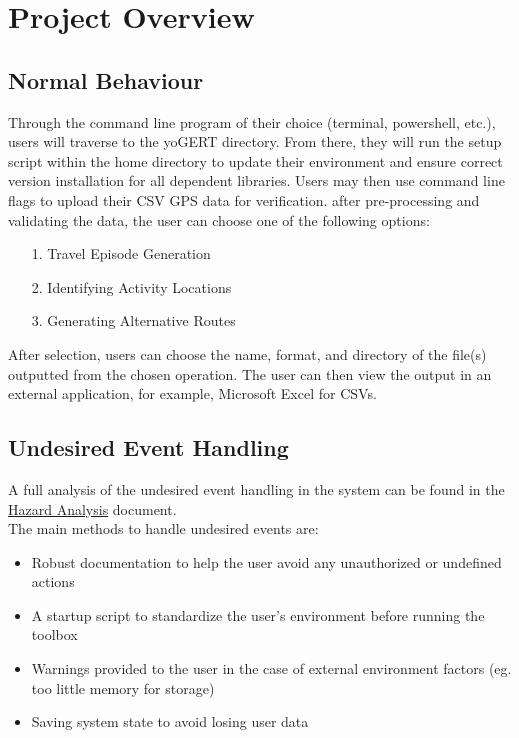 \documentclass[12pt, titlepage]{article}
\begin{document}
\newpage
\section{Project Overview}

\subsection{Normal Behaviour}
Through the command line program of their choice (terminal, powershell, etc.), users will traverse to the yoGERT directory. From there, they will run the setup script within the home directory to update their environment and ensure correct version installation for all dependent libraries. Users may then use command line flags to upload their CSV GPS data for verification. after pre-processing and validating the data, the user can choose one of the following options:

\begin{itemize}
    \item[1.] Travel Episode Generation
    \item[2.] Identifying Activity Locations
    \item[3.] Generating Alternative Routes
\end{itemize}

After selection, users can choose the name, format, and directory of the file(s) outputted from the chosen operation. The user can then view the output in an external application, for example, Microsoft Excel for CSVs. 

\subsection{Undesired Event Handling}


\noindent A full analysis of the undesired event handling in the system can be found in the \href{../../HazardAnalysis/HazardAnalysis.pdf}{Hazard Analysis} document.\\

\noindent The main methods to handle undesired events are:
\begin{itemize}
    \item Robust documentation to help the user avoid any unauthorized or undefined actions
    \item A startup script to standardize the user's environment before running the toolbox
    \item Warnings provided to the user in the case of external environment factors (eg. too little memory for storage)
    \item Saving system state to avoid losing user data
\end{itemize}
\end{document}
